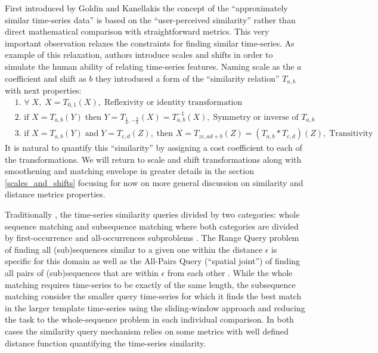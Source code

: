 First introduced by Goldin and Kanellakis \cite{citeulike:3815880} the concept of the ``approximately similar time-series data'' is based on the ``user-perceived similarity'' rather than direct mathematical comparison with straightforward metrics. This very important observation relaxes the constraints for finding similar time-series. As example of this relaxation, authors introduce scales and shifts in order to simulate the human ability of relating time-series features. Naming scale as the $a$ coefficient and shift as $b$ they introduced a form of the ``similarity relation'' $T_{a,b}$ with next properties:
\begin{align}
 & \text{1. } \forall \; X, \; X=T_{0,1}(X), \; \text{Reflexivity or identity transformation} \\
 & \text{2. } \text{if } X=T_{a,b}(Y) \; \text{then } Y=T_{\frac{1}{a},-\frac{b}{a}}(X) = T^{-1}_{a,b}(X), \; \text{Symmetry or inverse of $T_{a,b}$} \\
 & \text{3. } \text{if } X=T_{a,b}(Y) \; \text{and} \; Y=T_{c,d}(Z), \; \text{then } X=T_{zc, ad+b}(Z) = (T_{a,b} * T_{c,d})(Z), \; \text{Transitivity}
\end{align}
It is natural to quantify this ``similarity'' by assigning a cost coefficient to each of the transformations. We will return to scale and shift transformations along with smoothening and matching envelope in greater details in the section \ref{scales_and_shifts} focusing for now on more general discussion on similarity and distance metrics properties.

Traditionally \cite{citeulike:3973409}, the time-series similarity queries divided by two categories: whole sequence matching and subsequence matching where both categories are divided by first-occurrence and all-occurrences subproblems \cite{citeulike:3815880}. The Range Query problem of finding all (sub)sequences similar to a given one within the distance $\epsilon$ is specific for this domain as well as the All-Pairs Query (``spatial joint'') of finding all pairs of (sub)sequences that are within $\epsilon$ from each other \cite{citeulike:3973409}. While the whole matching requires time-series to be exactly of the same length, the subsequence matching consider the smaller query time-series for which it finds the best match in the larger template time-series using the sliding-window approach and reducing the task to the whole-sequence problem in each individual comparison. In both cases the similarity query mechanism relies on some metrics with well defined distance function quantifying the time-series similarity. 

